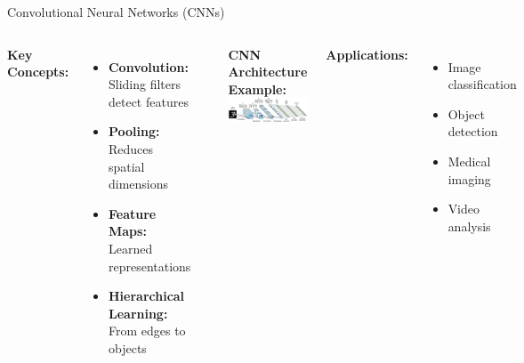 \documentclass[aspectratio=169]{beamer}
\begin{document}
\begin{frame}{Convolutional Neural Networks (CNNs)}
  \begin{columns}
    \textbf{Key Concepts:}
    \begin{itemize}
      \item \textbf{Convolution:} Sliding filters detect features
      \item \textbf{Pooling:} Reduces spatial dimensions
      \item \textbf{Feature Maps:} Learned representations
      \item \textbf{Hierarchical Learning:} From edges to objects
    \end{itemize}
    
    \vspace{0.3cm}
    \includegraphics[width=\textwidth]{images/convolutional_layer.png}
    
    \textbf{CNN Architecture Example:}
    \includegraphics[width=\textwidth]{images/imagenet_architecture.png}
    
    \vspace{0.3cm}
    \textbf{Applications:}
    \begin{itemize}
      \item Image classification
      \item Object detection
      \item Medical imaging
      \item Video analysis
    \end{itemize}
  \end{columns}
\end{frame}
\end{document}
